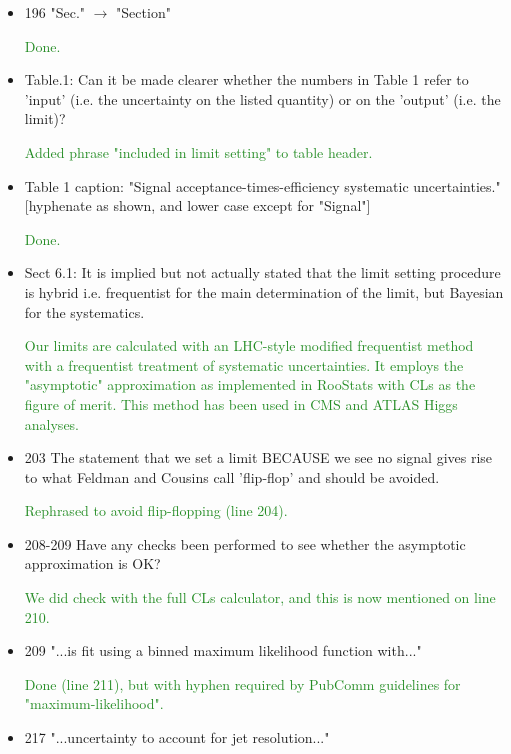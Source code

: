 \documentclass[paper=a4, fontsize=11pt]{scrartcl}
\begin{document}
\begin{itemize}
\item 196 "Sec." $\rightarrow$  "Section"

\textcolor{ForestGreen}{Done.}

\item Table.1:
Can it be made clearer whether the numbers in Table 1 refer to 'input'
(i.e. the uncertainty on the listed
quantity) or on the 'output' (i.e. the limit)?

\textcolor{ForestGreen}{Added phrase "included in limit setting" to table header.}

\item Table 1 caption:
 "Signal acceptance-times-efficiency systematic uncertainties."
 [hyphenate as shown, and lower case except for "Signal"]
 
\textcolor{ForestGreen}{Done.}

\item Sect 6.1:
It is implied but not actually stated that the limit setting procedure is
hybrid i.e. frequentist for the main
determination of the limit, but Bayesian for the systematics.

\textcolor{ForestGreen}{Our limits are calculated with an LHC-style modified frequentist method with a frequentist treatment of systematic uncertainties. It employs the "asymptotic" approximation as implemented in RooStats with CLs as the figure of merit. This method has been used in CMS and ATLAS Higgs analyses.}

\item 203 The statement that we set a limit BECAUSE we see no signal gives rise
to what Feldman and Cousins call
'flip-flop' and should be avoided.

\textcolor{ForestGreen}{Rephrased to avoid flip-flopping (line 204).}

\item 208-209 Have any checks been performed to see whether the asymptotic
approximation is OK?

\textcolor{ForestGreen}{We did check with the full CLs calculator,
and this is now mentioned on line 210.}

\item 209 "...is fit using a binned maximum likelihood function with..."

\textcolor{ForestGreen}{Done (line 211), but with hyphen required by PubComm guidelines
for "maximum-likelihood".}

\item 217 "...uncertainty to account for jet resolution..."


\end{itemize}
\end{document}
